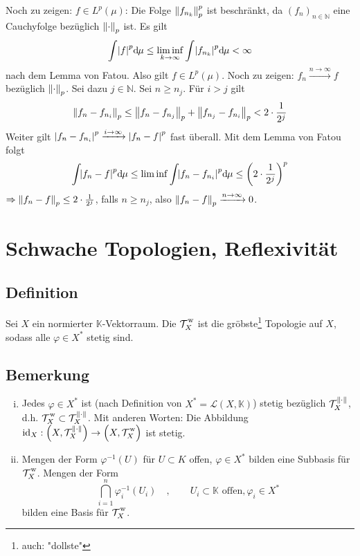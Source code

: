 Noch zu zeigen: $f \in L^p(\mu)$: Die Folge $\norm[p]{f_{n_k}}^p$ ist beschränkt, da $(f_n)_{n \in \mathds{N}}$ eine Cauchyfolge bezüglich $\norm[p]{\cdot}$ ist. Es gilt
\[
	\int \abs*{f}^p \mathd \mu \le \liminf\limits_{k \to \infty} \int \abs*{f_{n_k}}^p \mathd \mu < \infty
\]
nach dem Lemma von Fatou. Also gilt $f \in L^p(\mu)$.
Noch zu zeigen: $f_n \xrightarrow{n \to \infty} f$ bezüglich $\norm[p]{\cdot }$. Sei dazu $j \in \mathds{N}$. Sei $n \ge n_j$. Für $i>j$ gilt
\[
	\norm[p]{f_n - f_{n_i}} \le \norm[p]{f_n - f_{n_j}} + \norm[p]{f_{n_j}- f_{n_i}} < 2 \cdot \frac{1}{2^j}    
\]
Weiter gilt $\abs*{f_{n}- f_{n_i}}^p \xrightarrow{i \to \infty} \abs*{f_n -f}^p$ fast überall. Mit dem Lemma von Fatou folgt 
\[
	\int\!\abs*{f_n- f}^p \mathd\mu \le \liminf \int \! \abs*{f_n - f_{n_i}}^p \mathd\mu  \le \enbrace*{2 \cdot \frac{1}{2^j}}^p
\]
$\Rightarrow \norm[p]{f_n -f} \le 2 \cdot \frac{1}{2^j}$, falls $n \ge n_j$, also $\norm[p]{f_n -f} \xrightarrow{n \to \infty} 0 $. \bewende
\newpage

\section{Schwache Topologien, Reflexivität} %
\label{sec:5}
\subsection[Definition: Schwache Topologie]{Definition} %
\label{sub:51}
Sei $X$ ein normierter $\mathds{K}$-Vektorraum. Die  $\weakT{X}$ ist die gröbste\footnote{auch: "dollste"} Topologie auf $X$, sodass alle 
$\varphi \in X^*$ stetig sind. 

\subsection[Bemerkungen zu schwachen Topologie]{Bemerkung} %
\label{sub:52}
\begin{enumerate}[(i)]
	\item Jedes $\varphi \in X^*$ ist (nach Definition von $X^*=\mathcal{L}(X,\mathds{K})$) stetig bezüglich $\mathcal{T}^{\norm{\cdot}}_X$, d.h. 
	$\weakT{X} \subset \mathcal{T}_X^{\norm{\cdot}}$. Mit anderen Worten: Die Abbildung 
	$\id_X: \enbrace*{X,\mathcal{T}_X^{\norm{\cdot}}}\to\enbrace[\Big]{X,\weakT{X}}$ ist stetig.
	\item Mengen der Form $\varphi ^{-1}(U)$ für $U \subset K$ offen, $\varphi \in X^*$ bilden eine Subbasis für $\weakT{X}$. Mengen der Form 
	\[
		\bigcap_{i=1}^n \varphi_i ^{-1} (U_i) \quad, \qquad U_i \subset \mathds{K} \text{ offen}, \varphi_i \in X^*
	\]
	bilden eine Basis für $\weakT{X}$.
\end{enumerate}

